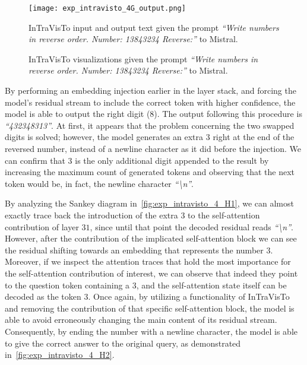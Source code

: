 \begin{figure}[tp!]
    \centering
    \texttt{[image: exp\_intravisto\_4G\_output.png]}
    \caption{InTraVisTo input and output text given the prompt \emph{``Write numbers in reverse order. Number: 13843234 Reverse:''} to Mistral.}
    \label{fig:exp_intravisto_4_G1}
\end{figure}

\begin{figure}[tp!]
    \centering
    \quad
    \caption{InTraVisTo visualizations given the prompt \emph{``Write numbers in reverse order. Number: 13843234 Reverse:''} to Mistral.}
    \label{fig:exp_intravisto_4_G}
\end{figure}

By performing an embedding injection earlier in the layer stack, and forcing the model's residual stream to include the correct token with higher confidence, the model is able to output the right digit ($8$).
The output following this procedure is \emph{``432348313''}.
At first, it appears that the problem concerning the two swapped digits is solved; however, the model generates an extra $3$ right at the end of the reversed number, instead of a newline character as it did before the injection.
We can confirm that $3$ is the only additional digit appended to the result by increasing the maximum count of generated tokens and observing that the next token would be, in fact, the newline character \emph{``\textbackslash{}n''}.

By analyzing the Sankey diagram in~\cref{fig:exp_intravisto_4_H1}, we can almost exactly trace back the introduction of the extra $3$ to the self-attention contribution of layer $31$, since until that point the decoded residual reads \emph{``\textbackslash{}n''}.
However, after the contribution of the implicated self-attention block we can see the residual shifting towards an embedding that represents the number $3$.
Moreover, if we inspect the attention traces that hold the most importance for the self-attention contribution of interest, we can observe that indeed they point to the question token containing a $3$, and the self-attention state itself can be decoded as the token $3$.
Once again, by utilizing a functionality of InTraVisTo and removing the contribution of that specific self-attention block, the model is able to avoid erroneously changing the main content of its residual stream.
Consequently, by ending the number with a newline character, the model is able to give the correct answer to the original query, as demonstrated in~\cref{fig:exp_intravisto_4_H2}.

